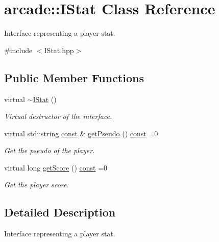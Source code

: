 \hypertarget{classarcade_1_1_i_stat}{\section{arcade\-:\-:I\-Stat Class Reference}
\label{classarcade_1_1_i_stat}
}


Interface representing a player stat.  




{\ttfamily \#include $<$I\-Stat.\-hpp$>$}

\subsection*{Public Member Functions}
\begin{DoxyCompactItemize}
\item 
virtual \hyperlink{classarcade_1_1_i_stat_af8996c563dee5095d30592647fd0f00c}{$\sim$\-I\-Stat} ()
\begin{DoxyCompactList}\small\item\em Virtual destructor of the interface. \end{DoxyCompactList}\item 
virtual std\-::string \hyperlink{term__entry_8h_a57bd63ce7f9a353488880e3de6692d5a}{const} \& \hyperlink{classarcade_1_1_i_stat_a3f5b976c04d3dcdd38f27c3b328b1138}{get\-Pseudo} () \hyperlink{term__entry_8h_a57bd63ce7f9a353488880e3de6692d5a}{const} =0
\begin{DoxyCompactList}\small\item\em Get the pseudo of the player. \end{DoxyCompactList}\item 
virtual long \hyperlink{classarcade_1_1_i_stat_acda674f38783f8d12db43103655642b7}{get\-Score} () \hyperlink{term__entry_8h_a57bd63ce7f9a353488880e3de6692d5a}{const} =0
\begin{DoxyCompactList}\small\item\em Get the player score. \end{DoxyCompactList}\end{DoxyCompactItemize}


\subsection{Detailed Description}
Interface representing a player stat. 

